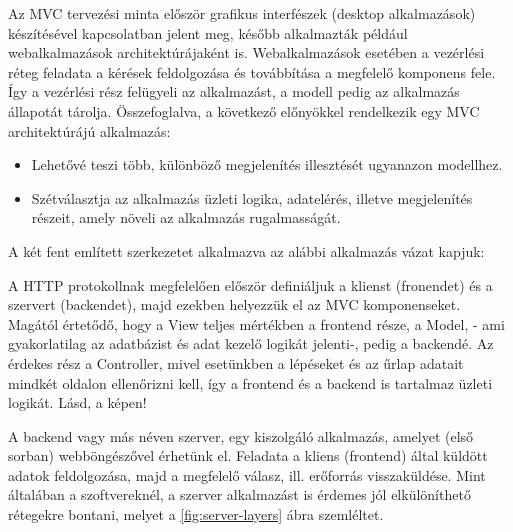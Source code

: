 Az MVC tervezési minta először grafikus interfészek (desktop alkalmazások) készítésével kapcsolatban jelent meg, később alkalmazták például webalkalmazások architektúrájaként is. Webalkalmazások esetében a vezérlési réteg feladata a kérések feldolgozása és továbbítása a megfelelő komponens fele. Így a vezérlési rész felügyeli az alkalmazást, a modell pedig az alkalmazás állapotát tárolja. Összefoglalva, a következő előnyökkel rendelkezik egy MVC architektúrájú alkalmazás:
\begin{itemize}
	\item Lehetővé teszi több, különböző megjelenítés illesztését ugyanazon modellhez.
	\item Szétválasztja az alkalmazás üzleti logika, adatelérés, illetve megjelenítés részeit, amely növeli az alkalmazás rugalmasságát.
\end{itemize}



A két fent említett szerkezetet alkalmazva az alábbi alkalmazás vázat kapjuk:

A HTTP protokollnak megfelelően először definiáljuk a klienst (fronendet) és a szervert (backendet), majd ezekben helyezzük el az MVC komponenseket. Magától értetődő, hogy a View teljes mértékben a frontend része, a Model, - ami gyakorlatilag az adatbázist és adat kezelő logikát jelenti-, pedig a backendé. Az érdekes rész a Controller, mivel esetünkben a lépéseket és az űrlap adatait mindkét oldalon ellenőrizni kell, így a frontend és a backend is tartalmaz üzleti logikát. Lásd, a képen!


A backend vagy más néven szerver, egy kiszolgáló alkalmazás, amelyet (első sorban) webböngészővel érhetünk el. Feladata a kliens (frontend) által küldött adatok feldolgozása, majd a megfelelő válasz, ill. erőforrás visszaküldése. Mint általában a szoftvereknél, a szerver alkalmazást is érdemes jól elkülöníthető rétegekre bontani, melyet a \ref{fig:server-layers} ábra szemléltet.

